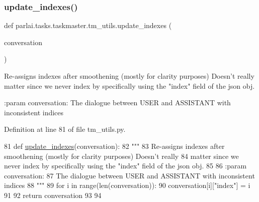 \mbox{\label{namespaceparlai_1_1tasks_1_1taskmaster_1_1tm__utils_ad0c8c99eb4b5152ca8cec2a8fe7895fd}} 
\subsubsection{\texorpdfstring{update\+\_\+indexes()}{update\_indexes()}}
{\footnotesize\ttfamily def parlai.\+tasks.\+taskmaster.\+tm\+\_\+utils.\+update\+\_\+indexes (\begin{DoxyParamCaption}\item[{}]{conversation }\end{DoxyParamCaption})}

\begin{DoxyVerb}Re-assigns indexes after smoothening (mostly for clarity purposes) Doesn't really
matter since we never index by specifically using the "index" field of the json obj.

:param conversation:
    The dialogue between USER and ASSISTANT with inconsistent indices
\end{DoxyVerb}
 

Definition at line 81 of file tm\+\_\+utils.\+py.


\begin{DoxyCode}
81 \textcolor{keyword}{def }\hyperlink{namespaceparlai_1_1tasks_1_1taskmaster_1_1tm__utils_ad0c8c99eb4b5152ca8cec2a8fe7895fd}{update\_indexes}(conversation):
82     \textcolor{stringliteral}{"""}
83 \textcolor{stringliteral}{    Re-assigns indexes after smoothening (mostly for clarity purposes) Doesn't really}
84 \textcolor{stringliteral}{    matter since we never index by specifically using the "index" field of the json obj.}
85 \textcolor{stringliteral}{}
86 \textcolor{stringliteral}{    :param conversation:}
87 \textcolor{stringliteral}{        The dialogue between USER and ASSISTANT with inconsistent indices}
88 \textcolor{stringliteral}{    """}
89     \textcolor{keywordflow}{for} i \textcolor{keywordflow}{in} range(len(conversation)):
90         conversation[i][\textcolor{stringliteral}{"index"}] = i
91 
92     \textcolor{keywordflow}{return} conversation
93 
94 
\end{DoxyCode}


